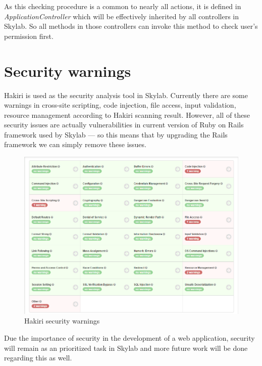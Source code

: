 As this checking procedure is a common to nearly all actions, it is defined in \textit{ApplicationController} which will be effectively inherited by all controllers in Skylab. So all methods in those controllers can invoke this method to check user's permission first.

\section{Security warnings}

Hakiri is used as the security analysis tool in Skylab. Currently there are some warnings in cross-site scripting, code injection, file access, input validation, resource management according to Hakiri scanning result. However, all of these security issues are actually vulnerabilities in current version of Ruby on Rails framework used by Skylab --- so this means that by upgrading the Rails framework we can simply remove these issues.

\begin{figure}[h]
	\centering
	\includegraphics[width=\textwidth]{Images/Skylab_Hakiri.png}
	\caption{Hakiri security warnings}
	\label{fig:SkylabHakiri}
\end{figure}

Due the importance of security in the development of a web application, security will remain as an prioritized task in Skylab and more future work will be done regarding this as well.
